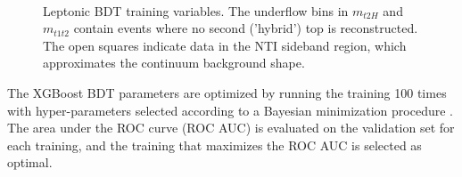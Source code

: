\begin{figure}[htbp]
	\\
  \caption{Leptonic BDT training variables. The underflow bins in $m_{t2H}$ and $m_{t1t2}$ contain events where no second ('hybrid') top is reconstructed. The open squares indicate data in the NTI sideband region, which approximates the continuum background shape. }  	
  \label{fig:lepvbls3}
\end{figure}

\clearpage

The XGBoost BDT parameters are optimized by running the training 100 times with hyper-parameters selected according to a Bayesian minimization procedure \cite{skopt}. The area under the ROC curve (ROC AUC) is evaluated on the validation set for each training, and the training that maximizes the ROC AUC is selected as optimal.

